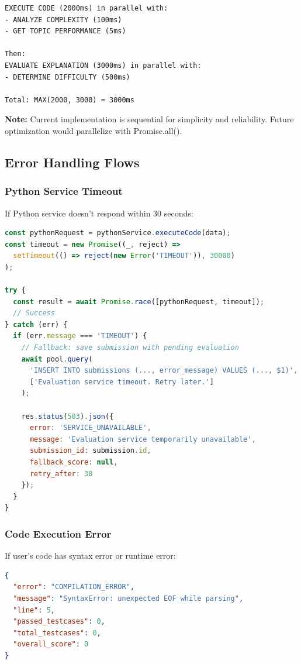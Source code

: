 \documentclass[12pt,a4paper,oneside]{article}
\begin{document}
\begin{lstlisting}
EXECUTE CODE (2000ms) in parallel with:
- ANALYZE COMPLEXITY (100ms)
- GET TOPIC PERFORMANCE (5ms)

Then:
EVALUATE EXPLANATION (3000ms) in parallel with:
- DETERMINE DIFFICULTY (500ms)

Total: MAX(2000, 3000) = 3000ms
\end{lstlisting}

\textbf{Note:} Current implementation is sequential for simplicity and reliability. Future optimization would parallelize with Promise.all().

\subsection{Error Handling Flows}

\subsubsection{Python Service Timeout}

If Python service doesn't respond within 30 seconds:

\begin{lstlisting}[language=JavaScript, caption=Timeout Handling]
const pythonRequest = pythonService.executeCode(data);
const timeout = new Promise((_, reject) => 
  setTimeout(() => reject(new Error('TIMEOUT')), 30000)
);

try {
  const result = await Promise.race([pythonRequest, timeout]);
  // Success
} catch (err) {
  if (err.message === 'TIMEOUT') {
    // Fallback: save submission with pending evaluation
    await pool.query(
      'INSERT INTO submissions (..., error_message) VALUES (..., $1)',
      ['Evaluation service timeout. Retry later.']
    );
    
    res.status(503).json({
      error: 'SERVICE_UNAVAILABLE',
      message: 'Evaluation service temporarily unavailable',
      submission_id: submission.id,
      fallback_score: null,
      retry_after: 30
    });
  }
}
\end{lstlisting}

\subsubsection{Code Execution Error}

If user's code has syntax error or runtime error:

\begin{lstlisting}[language=JSON, caption=Compilation Error Response]
{
  "error": "COMPILATION_ERROR",
  "message": "SyntaxError: unexpected EOF while parsing",
  "line": 5,
  "passed_testcases": 0,
  "total_testcases": 0,
  "overall_score": 0
}
\end{lstlisting}
\end{document}
